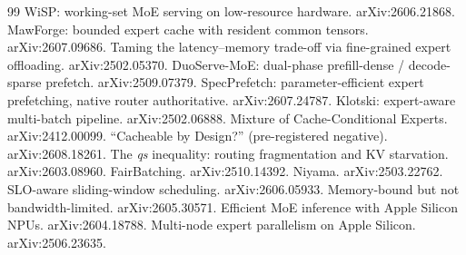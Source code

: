 \documentclass[11pt]{article}
\begin{document}
\begin{thebibliography}{99}
\small
{} WiSP: working-set MoE serving on low-resource hardware. arXiv:2606.21868.
 MawForge: bounded expert cache with resident common tensors. arXiv:2607.09686.
 Taming the latency--memory trade-off via fine-grained expert offloading. arXiv:2502.05370.
 DuoServe-MoE: dual-phase prefill-dense / decode-sparse prefetch. arXiv:2509.07379.
 SpecPrefetch: parameter-efficient expert prefetching, native router authoritative. arXiv:2607.24787.
 Klotski: expert-aware multi-batch pipeline. arXiv:2502.06888.
 Mixture of Cache-Conditional Experts. arXiv:2412.00099.
 ``Cacheable by Design?'' (pre-registered negative). arXiv:2608.18261.
 The \emph{qs} inequality: routing fragmentation and KV starvation. arXiv:2603.08960.
 FairBatching. arXiv:2510.14392.
 Niyama. arXiv:2503.22762.
 SLO-aware sliding-window scheduling. arXiv:2606.05933.
 Memory-bound but not bandwidth-limited. arXiv:2605.30571.
 Efficient MoE inference with Apple Silicon NPUs. arXiv:2604.18788.
 Multi-node expert parallelism on Apple Silicon. arXiv:2506.23635.
\end{thebibliography}
\end{document}
